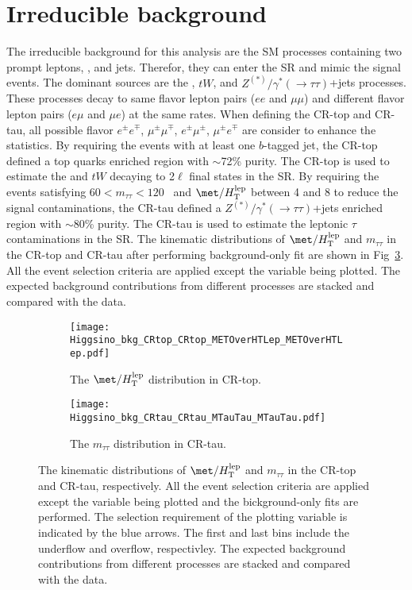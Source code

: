 \section{Irreducible background}
\label{sec:bkg_irreducible_background}
The irreducible background for this analysis are the SM processes containing two prompt leptons, \met, and jets.
Therefor, they can enter the SR and mimic the signal events.
The dominant sources are the \ttbar, $tW$, and $Z^{(*)}/\gamma^{*}(\to \tau \tau)$+jets processes.
These processes decay to same flavor lepton pairs ($ee$ and $\mu \mu$) and different flavor lepton pairs ($e \mu$ and $\mu e$) at the same rates.
When defining the CR-top and CR-tau, all possible flavor $e^{\pm} e^{\mp}$, $\mu^{\pm} \mu^{\mp}$, $e^{\pm} \mu^{\pm}$, $\mu^{\pm} e^{\mp}$ are consider to enhance the statistics.
By requiring the events with at least one $b$-tagged jet, the CR-top defined a top quarks enriched region with $\sim$72\% purity.
The CR-top is used to estimate the \ttbar and $tW$ decaying to 2$\ell$ final states in the SR.
By requiring the events satisfying $60 < m_{\tau \tau} < 120$~{\GeV} and $\met/H_{\mathrm{T}}^{\mathrm{lep}}$ between 4 and 8 to reduce the signal contaminations, the CR-tau defined a $Z^{(*)}/\gamma^{*}(\to \tau \tau)$+jets enriched region with $\sim$80\% purity.
The CR-tau is used to estimate the leptonic $\tau$ contaminations in the SR.
The kinematic distributions of $\met/H_\mathrm{T}^\mathrm{lep}$ and $m_{\tau \tau}$ in the CR-top and CR-tau after performing background-only fit are shown in Fig~\ref{fig:bkg_kinematic_distributions_in_CRs}.
All the event selection criteria are applied except the variable being plotted.
The expected background contributions from different processes are stacked and compared with the data.

\begin{figure}[ht]
    \begin{center}
        \begin{subfigure}[b]{0.48\textwidth}
            \texttt{[image: Higgsino\_bkg\_CRtop\_CRtop\_METOverHTLep\_METOverHTLep.pdf]}
            \caption{The $\met/H_\mathrm{T}^\mathrm{lep}$ distribution in CR-top.}
            \label{}
        \end{subfigure}
        \begin{subfigure}[b]{0.48\textwidth}
            \texttt{[image: Higgsino\_bkg\_CRtau\_CRtau\_MTauTau\_MTauTau.pdf]}
            \caption{The $m_{\tau \tau}$ distribution in CR-tau.}
            \label{}
        \end{subfigure}
        \caption{The kinematic distributions of $\met/H_\mathrm{T}^\mathrm{lep}$ and $m_{\tau \tau}$ in the CR-top and CR-tau, respectively.
        All the event selection criteria are applied except the variable being plotted and the bickground-only fits are performed.
        The selection requirement of the plotting variable is indicated by the blue arrows.
        The first and last bins include the underflow and overflow, respectivley.
        The expected background contributions from different processes are stacked and compared with the data.}
        \label{fig:bkg_kinematic_distributions_in_CRs}
    \end{center}
\end{figure}

